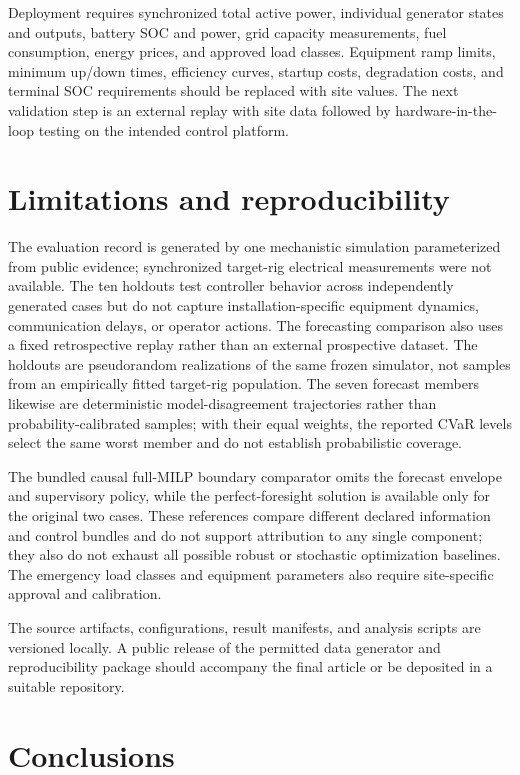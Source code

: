 Deployment requires synchronized total active power, individual generator
states and outputs, battery SOC and power, grid capacity measurements, fuel
consumption, energy prices, and approved load classes. Equipment ramp limits,
minimum up/down times, efficiency curves, startup costs, degradation costs,
and terminal SOC requirements should be replaced with site values. The next
validation step is an external replay with site data followed by
hardware-in-the-loop testing on the intended control platform.

\section{Limitations and reproducibility}\label{limitations-and-reproducibility}

The evaluation record is generated by one mechanistic simulation parameterized
from public evidence; synchronized target-rig electrical measurements were not
available. The ten holdouts test controller behavior across independently
generated cases but do not capture installation-specific equipment dynamics,
communication delays, or operator actions. The forecasting comparison also
uses a fixed retrospective replay rather than an external prospective dataset.
The holdouts are pseudorandom realizations of the same frozen simulator, not
samples from an empirically fitted target-rig population. The seven forecast
members likewise are deterministic model-disagreement trajectories rather than
probability-calibrated samples; with their equal weights, the reported CVaR
levels select the same worst member and do not establish probabilistic coverage.

The bundled causal full-MILP boundary comparator omits the forecast envelope and
supervisory policy, while the perfect-foresight solution is available only for
the original two cases. These references compare different declared information
and control bundles and do not support attribution to any single component;
they also do not exhaust all possible robust or stochastic optimization
baselines. The emergency load classes and equipment parameters also require
site-specific approval and calibration.

The source artifacts, configurations, result manifests, and analysis scripts
are versioned locally. A public release of the permitted data generator and
reproducibility package should accompany the final article or be deposited in
a suitable repository.

\section{Conclusions}\label{conclusions}

